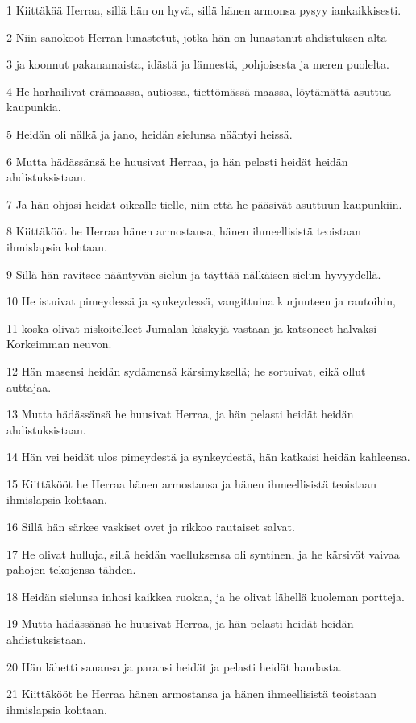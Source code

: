 \par 1 Kiittäkää Herraa, sillä hän on hyvä, sillä hänen armonsa pysyy iankaikkisesti.
\par 2 Niin sanokoot Herran lunastetut, jotka hän on lunastanut ahdistuksen alta
\par 3 ja koonnut pakanamaista, idästä ja lännestä, pohjoisesta ja meren puolelta.
\par 4 He harhailivat erämaassa, autiossa, tiettömässä maassa, löytämättä asuttua kaupunkia.
\par 5 Heidän oli nälkä ja jano, heidän sielunsa nääntyi heissä.
\par 6 Mutta hädässänsä he huusivat Herraa, ja hän pelasti heidät heidän ahdistuksistaan.
\par 7 Ja hän ohjasi heidät oikealle tielle, niin että he pääsivät asuttuun kaupunkiin.
\par 8 Kiittäkööt he Herraa hänen armostansa, hänen ihmeellisistä teoistaan ihmislapsia kohtaan.
\par 9 Sillä hän ravitsee nääntyvän sielun ja täyttää nälkäisen sielun hyvyydellä.
\par 10 He istuivat pimeydessä ja synkeydessä, vangittuina kurjuuteen ja rautoihin,
\par 11 koska olivat niskoitelleet Jumalan käskyjä vastaan ja katsoneet halvaksi Korkeimman neuvon.
\par 12 Hän masensi heidän sydämensä kärsimyksellä; he sortuivat, eikä ollut auttajaa.
\par 13 Mutta hädässänsä he huusivat Herraa, ja hän pelasti heidät heidän ahdistuksistaan.
\par 14 Hän vei heidät ulos pimeydestä ja synkeydestä, hän katkaisi heidän kahleensa.
\par 15 Kiittäkööt he Herraa hänen armostansa ja hänen ihmeellisistä teoistaan ihmislapsia kohtaan.
\par 16 Sillä hän särkee vaskiset ovet ja rikkoo rautaiset salvat.
\par 17 He olivat hulluja, sillä heidän vaelluksensa oli syntinen, ja he kärsivät vaivaa pahojen tekojensa tähden.
\par 18 Heidän sielunsa inhosi kaikkea ruokaa, ja he olivat lähellä kuoleman portteja.
\par 19 Mutta hädässänsä he huusivat Herraa, ja hän pelasti heidät heidän ahdistuksistaan.
\par 20 Hän lähetti sanansa ja paransi heidät ja pelasti heidät haudasta.
\par 21 Kiittäkööt he Herraa hänen armostansa ja hänen ihmeellisistä teoistaan ihmislapsia kohtaan.
